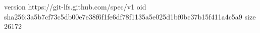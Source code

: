 version https://git-lfs.github.com/spec/v1
oid sha256:3a5b7cf73c5db00e7e38f6f1fe6df78f1135a5e025d1bf0bc37b15f411a4c5a9
size 26172
